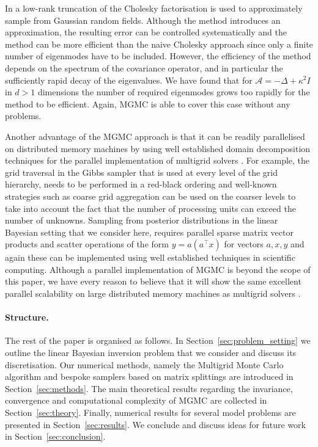 \documentclass[11pt,english]{article}
\theoremstyle{plain}
\theoremstyle{plain}
\theoremstyle{plain}
\theoremstyle{plain}
\numberwithin{equation}{section}
\newcommand*{\id}{I}
\begin{document}
In \cite{harbrecht2012low} a low-rank truncation of the Cholesky factorisation is used to approximately sample from Gaussian random fields. Although the method introduces an approximation, the resulting error can be controlled systematically and the method can be more efficient than the naive Cholesky approach since only a finite number of eigenmodes have to be included. However, the efficiency of the method depends on the spectrum of the covariance operator, and in particular the sufficiently rapid decay of the eigenvalues. We have found that for $\mathcal{A}=-\Delta+\kappa^2\id$ in $d>1$ dimensions the number of required eigenmodes grows too rapidly for the method to be efficient. Again, MGMC is able to cover this case without any problems.

Another advantage of the MGMC approach is that it can be readily parallelised on distributed memory machines by using well established domain decomposition techniques for the parallel implementation of multigrid solvers \cite{chow2006survey}. For example, the grid traversal in the Gibbs sampler that is used at every level of the grid hierarchy, needs to be performed in a red-black ordering and well-known strategies such as coarse grid aggregation \cite{blatt2012massively} can be used on the coarser levels to take into account the fact that the number of processing units can exceed the number of unknowns. Sampling from posterior distributions in the linear Bayesian setting that we consider here, requires parallel sparse matrix vector products and scatter operations of the form $y = a (a^\top x)$ for vectors $a,x,y$ and again these can be implemented using well established techniques in scientific computing. Although a parallel implementation of MGMC is beyond the scope of this paper, we have every reason to believe that it will show the same excellent parallel scalability on large distributed memory machines as multigrid solvers \cite{baker2012scaling,blatt2012massively,kohl2022textbook}.\vspace{-1ex}
\paragraph{Structure.}
The rest of the paper is organised as follows. In Section~\ref{sec:problem_setting} we outline the linear Bayesian inversion problem that we consider and discuss its discretisation. Our numerical methods, namely the Multigrid Monte Carlo algorithm and bespoke samplers based on matrix splittings are introduced in Section~\ref{sec:methods}. The main theoretical results regarding the invariance, convergence and computational complexity of MGMC are collected in Section~\ref{sec:theory}. Finally, numerical results for several model problems are presented in Section~\ref{sec:results}. We conclude and discuss ideas for future work in Section~\ref{sec:conclusion}.
\end{document}
